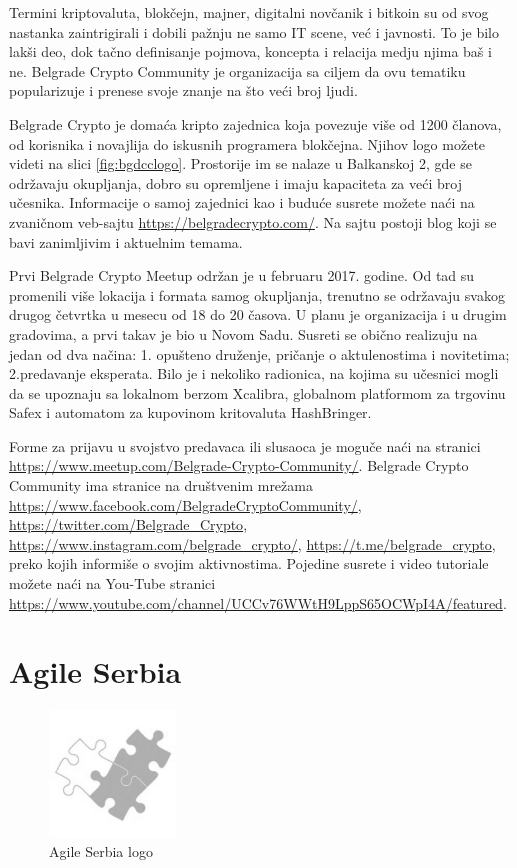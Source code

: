 \documentclass[a4paper]{article}
\begin{document}
{Termini  kriptovaluta, blokčejn, majner, digitalni novčanik i bitkoin su od svog nastanka zaintrigirali i dobili pažnju ne samo IT scene, već i javnosti. To je bilo lakši deo, dok tačno definisanje pojmova, koncepta i relacija medju njima baš i ne. Belgrade Crypto Community je organizacija sa ciljem da ovu tematiku popularizuje i prenese svoje znanje na što veći broj ljudi.

Belgrade Crypto je domaća kripto zajednica koja povezuje više od 1200 članova, od korisnika i novajlija do iskusnih programera blokčejna. Njihov logo možete videti na slici \ref{fig:bgdcclogo}. Prostorije im se nalaze u Balkanskoj 2, gde se održavaju okupljanja, dobro su opremljene i imaju kapaciteta za veći broj učesnika. Informacije o samoj zajednici kao i buduće susrete možete naći na zvaničnom veb-sajtu \url{https://belgradecrypto.com/}. Na sajtu postoji blog koji se bavi zanimljivim i aktuelnim temama.

Prvi Belgrade Crypto Meetup održan je u februaru 2017. godine. Od tad su promenili više lokacija i formata samog okupljanja, trenutno se održavaju svakog drugog četvrtka u mesecu od 18 do 20 časova. U planu je organizacija i u drugim gradovima, a prvi takav je bio u Novom Sadu. Susreti se obično realizuju na jedan od dva načina: 1. opušteno druženje, pričanje o aktulenostima i novitetima; 2.predavanje eksperata. Bilo je i nekoliko radionica, na kojima su učesnici mogli  da se upoznaju sa lokalnom berzom Xcalibra, globalnom platformom za trgovinu Safex i automatom za kupovinom kritovaluta HashBringer. 

Forme za prijavu u svojstvo predavaca ili slusaoca je moguče naći na stranici \url{https://www.meetup.com/Belgrade-Crypto-Community/}. Belgrade Crypto Community ima stranice na društvenim mrežama \url{https://www.facebook.com/BelgradeCryptoCommunity/}, \url{https://twitter.com/Belgrade_Crypto}, \url{https://www.instagram.com/belgrade_crypto/}, \url{https://t.me/belgrade_crypto}, preko kojih informiše o svojim aktivnostima. Pojedine susrete i video tutoriale možete naći na You-Tube stranici \url{https://www.youtube.com/channel/UCCv76WWtH9LppS65OCWpI4A/featured}.


\section{Agile Serbia}
\label{sec:agsrb}

\begin{figure}[h]
  \centering
  \includegraphics[width=0.3\textwidth]{agile_srb.png}
  \caption{Agile Serbia logo}
  \label{fig:agslogo}
\end{figure}

}
\end{document}
